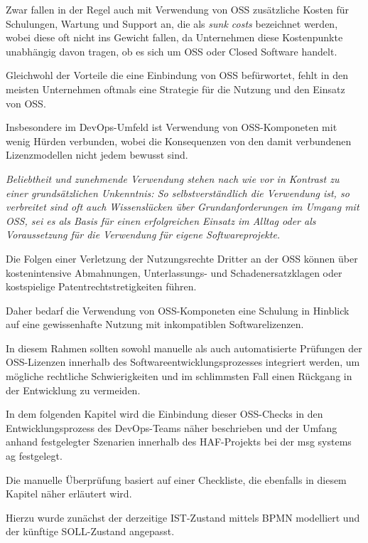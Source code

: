 Zwar fallen in der Regel auch mit Verwendung von OSS zusätzliche Kosten für Schulungen, Wartung und Support an, die als \emph{sunk costs} bezeichnet werden, wobei diese oft nicht ins Gewicht fallen, da Unternehmen diese Kostenpunkte unabhängig davon tragen, ob es sich um OSS oder Closed Software handelt. \cite{augsten_10_2019} 

Gleichwohl der Vorteile die eine Einbindung von OSS befürwortet, fehlt in den meisten Unternehmen oftmals eine Strategie für die Nutzung und den Einsatz von OSS. 

Insbesondere im DevOps-Umfeld ist Verwendung von OSS-Komponeten mit wenig Hürden verbunden, wobei die Konsequenzen von den damit verbundenen Lizenzmodellen nicht jedem bewusst sind. 

\textit{Beliebtheit und zunehmende Verwendung stehen nach wie vor in Kontrast zu
einer grundsätzlichen Unkenntnis: So selbstverständlich die Verwendung ist, so verbreitet sind
oft auch Wissenslücken über Grundanforderungen im Umgang mit OSS, sei es als Basis für einen
erfolgreichen Einsatz im Alltag oder als Voraussetzung für die Verwendung für eigene Softwareprojekte.} \cite{bitkom_ev_open_2016}

Die Folgen einer Verletzung der Nutzungsrechte Dritter an der OSS können über kostenintensive Abmahnungen, Unterlassungs- und Schadenersatzklagen oder kostspielige Patentrechtstretigkeiten führen. 

Daher bedarf die Verwendung von OSS-Komponeten eine Schulung in Hinblick auf eine gewissenhafte Nutzung mit inkompatiblen Softwarelizenzen. 

In diesem Rahmen sollten sowohl manuelle als auch automatisierte Prüfungen der OSS-Lizenzen innerhalb des Softwareentwicklungsprozesses integriert werden, um mögliche rechtliche Schwierigkeiten und im schlimmsten Fall einen Rückgang in der Entwicklung zu vermeiden. 

In dem folgenden Kapitel wird die Einbindung dieser OSS-Checks in den Entwicklungsprozess des DevOps-Teams näher beschrieben und der Umfang anhand festgelegter Szenarien innerhalb des HAF-Projekts bei der msg systems ag festgelegt. 

Die manuelle Überprüfung basiert auf einer Checkliste, die ebenfalls in diesem Kapitel näher erläutert wird. 

Hierzu wurde zunächst der derzeitige IST-Zustand mittels BPMN modelliert und der künftige SOLL-Zustand angepasst.




















